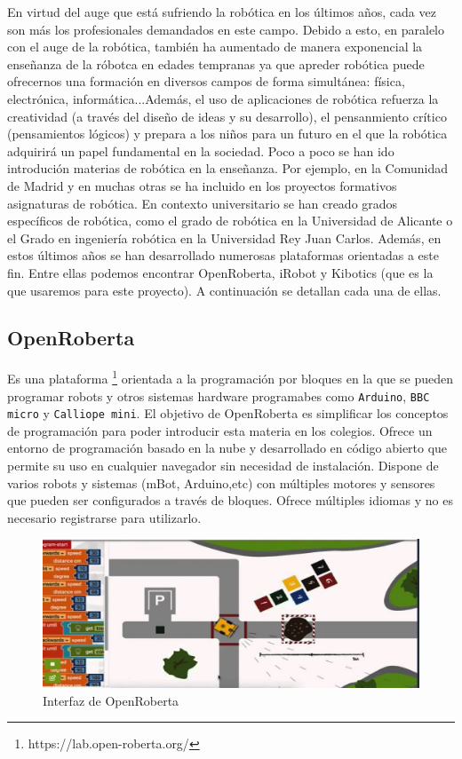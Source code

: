 \documentclass{report}
\begin{document}
En virtud del auge que está sufriendo la robótica en los últimos años, cada vez son más los profesionales demandados en este campo. Debido a esto, en paralelo con el auge de la robótica, también ha aumentado de manera exponencial la enseñanza de la róbotca en edades tempranas ya que apreder robótica puede ofrecernos una formación en diversos campos de forma simultánea: física, electrónica, informática...Además, el uso de aplicaciones de robótica refuerza la creatividad (a través del diseño de ideas y su desarrollo), el pensanmiento crítico (pensamientos lógicos) y prepara a los niños para un futuro en el que la robótica adquirirá un papel fundamental en la sociedad. Poco a poco se han ido introdución materias de robótica en la enseñanza. Por ejemplo, en la Comunidad de Madrid y en muchas otras se ha incluido en los proyectos formativos asignaturas de robótica. En contexto universitario se han creado grados específicos de robótica, como el grado de robótica en la Universidad de Alicante o el Grado en ingeniería robótica en la Universidad  Rey Juan Carlos. Además, en estos últimos años se han desarrollado numerosas plataformas orientadas a este fin. Entre ellas podemos encontrar OpenRoberta, iRobot y Kibotics (que es la que usaremos para este proyecto). A continuación se detallan cada una de ellas.

\subsection{OpenRoberta}

Es una plataforma \footnote{https://lab.open-roberta.org/} orientada a la programación por bloques en la que se pueden programar robots y otros sistemas hardware programabes como \texttt{Arduino}, \texttt{BBC micro} y \texttt{Calliope mini}. El objetivo de OpenRoberta es simplificar los conceptos de programación para poder introducir esta materia en los colegios. Ofrece un entorno de programación basado en la nube y desarrollado en código abierto que permite su uso en cualquier navegador sin necesidad de instalación. Dispone de varios robots y sistemas (mBot, Arduino,etc) con múltiples motores y sensores que pueden ser configurados a través de bloques. Ofrece múltiples idiomas y no es necesario registrarse para utilizarlo.

\renewcommand{\figurename}{Figura}		
\begin{figure}[h]
	\centering
	 \includegraphics[scale=0.34]{images/openRoberta.jpg}
	 \caption{Interfaz de OpenRoberta}
\end{figure}
\end{document}
